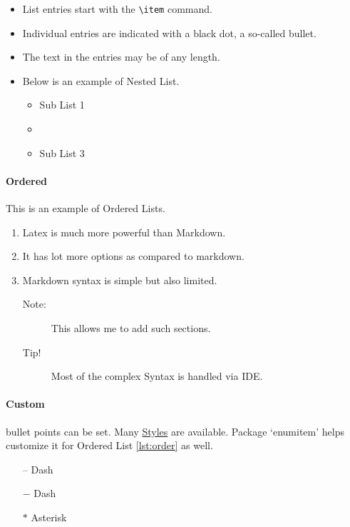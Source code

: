 \documentclass{report}[a4paper,12pt] %
\begin{document}
\begin{itemize}
  \label{lst:bullet}
  \item List entries start with the \verb|\item| command.
  \item Individual entries are indicated with a black dot, a so-called bullet.
  \item The text in the entries may be of any length.
  \item Below is an example of Nested List.
  \begin{itemize}
    \item Sub List 1
    \item \lipsum[1]
    \item Sub List 3
  \end{itemize}
\end{itemize}

\paragraph{Ordered}
This is an example of Ordered Lists.

\begin{enumerate}[label=(\roman*)]
  \label{lst:order}
  \item Latex is much more powerful than Markdown.
  \item It has lot more options as compared to markdown.
  \item Markdown syntax is simple but also limited.
  \begin{description}
    \item[Note:] This allows me to add such sections.
    \item[Tip!] Most of the complex Syntax is handled via IDE.
  \end{description}
\end{enumerate}

\paragraph{Custom} bullet points can be set. Many \href{https://latex-tutorial.com/bullet-styles/}{Styles} are available.
Package `enumitem' helps customize it for Ordered List \ref{lst:order} as well.
\begin{itemize}
  \label{lst:format}
  \item[--] Dash
  \item[$-$] Dash
  \item[$\ast$] Asterisk
\end{itemize}
\end{document}
